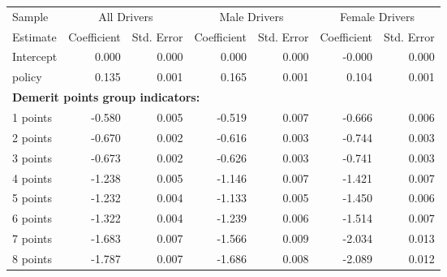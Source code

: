 
\begin{table}%
\centering 
\begin{tabular}{l r r r r r r} 

\hline 
 

Sample 
 & \multicolumn{2}{c}{All  Drivers}  & \multicolumn{2}{c}{Male  Drivers}  & \multicolumn{2}{c}{Female  Drivers}   \\ 
 

 \cmidrule(lr){1-1}\cmidrule(lr){2-3}\cmidrule(lr){4-5}\cmidrule(lr){6-7} 

Estimate  & Coefficient & Std. Error  & Coefficient & Std. Error  & Coefficient & Std. Error   \\ 
 

\hline 
 
Intercept  &  0.000  &  0.000  &  0.000  &  0.000  & -0.000  &  0.000   \\ 
 
policy  &  0.135  &  0.001  &  0.165  &  0.001  &  0.104  &  0.001   \\ 
 

\hline 
 
\multicolumn{4}{l}{\textbf{Demerit points group indicators:}}  \\ 
 
1 points  & -0.580  &  0.005  & -0.519  &  0.007  & -0.666  &  0.006   \\ 
 
2 points  & -0.670  &  0.002  & -0.616  &  0.003  & -0.744  &  0.003   \\ 
 
3 points  & -0.673  &  0.002  & -0.626  &  0.003  & -0.741  &  0.003   \\ 
 
4 points  & -1.238  &  0.005  & -1.146  &  0.007  & -1.421  &  0.007   \\ 
 
5 points  & -1.232  &  0.004  & -1.133  &  0.005  & -1.450  &  0.006   \\ 
 
6 points  & -1.322  &  0.004  & -1.239  &  0.006  & -1.514  &  0.007   \\ 
 
7 points  & -1.683  &  0.007  & -1.566  &  0.009  & -2.034  &  0.013   \\ 
 
8 points  & -1.787  &  0.007  & -1.686  &  0.008  & -2.089  &  0.012   \\ 
 

\end{tabular}
\end{table}
